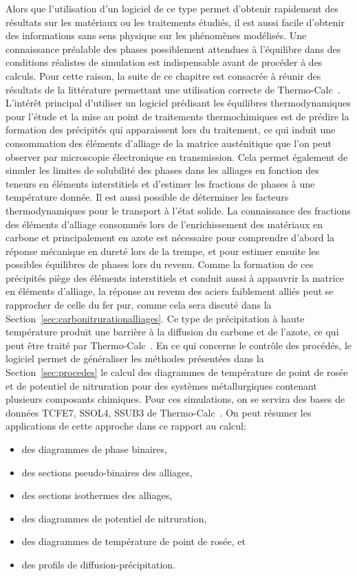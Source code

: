 Alors que l'utilisation d'un logiciel de ce type permet d'obtenir rapidement des résultats sur les matériaux ou les traitements étudiés, il est aussi facile d'obtenir des informations sans sens physique sur les phénomènes modélisés. Une connaissance préalable des phases possiblement attendues à l'équilibre dans des conditions réalistes de simulation est indispensable avant de procéder à des calculs. Pour cette raison, la suite de ce chapitre est consacrée à réunir des résultats de la littérature permettant une utilisation correcte de Thermo-Calc~\cite{Andersson2002,Borgenstam2000}. L'intérêt principal d'utiliser un logiciel prédisant les équilibres thermodynamiques pour l'étude et la mise au point de traitements thermochimiques est de prédire la formation des précipités qui apparaissent lors du traitement, ce qui induit une consommation des éléments d'alliage de la matrice austénitique que l'on peut observer par microscopie électronique en transmission. Cela permet également de simuler les limites de solubilité des phases dans les alliages en fonction des teneurs en éléments interstitiels et d'estimer les fractions de phases à une température donnée. Il est aussi possible  de déterminer les facteurs thermodynamiques pour le transport à l'état solide. La connaissance des fractions des éléments d'alliage consommés lors de l'enrichissement des matériaux en carbone et principalement en azote est nécessaire pour comprendre d'abord la réponse mécanique \textendash{} en dureté \textendash{} lors de la trempe, et pour estimer ensuite les possibles équilibres de phases lors du revenu. Comme la formation de ces précipités \og piège \fg{} des éléments interstitiels et conduit aussi à appauvrir la matrice en éléments d'alliage, la réponse au revenu des aciers faiblement alliés peut se rapprocher de celle du fer pur, comme cela sera discuté dans la Section~\ref{sec:carbonitrurationalliages}. Ce type de précipitation à haute température produit une barrière à la diffusion du carbone et de l'azote, ce qui peut être traité par Thermo-Calc~\cite{Andersson2002,Borgenstam2000}. En ce qui concerne le contrôle des procédés, le logiciel permet de généraliser les méthodes présentées dans la Section~\ref{sec:procedes} \textendash{} le calcul des diagrammes de température de point de rosée et de potentiel de nitruration \textendash{} pour des systèmes métallurgiques contenant plusieurs composants chimiques. Pour ces simulations, on se servira des bases de données TCFE7, SSOL4, SSUB3 de Thermo-Calc~\cite{Andersson2002,Borgenstam2000}. On peut résumer les applications de cette approche dans ce rapport au calcul:
\begin{itemize}
  \item des diagrammes de phase binaires,
  \item des sections pseudo-binaires des alliages,
  \item des sections isothermes des alliages,
  \item des diagrammes de potentiel de nitruration,
  \item des diagrammes de température de point de rosée, et
  \item des profils de diffusion-précipitation.
\end{itemize}

